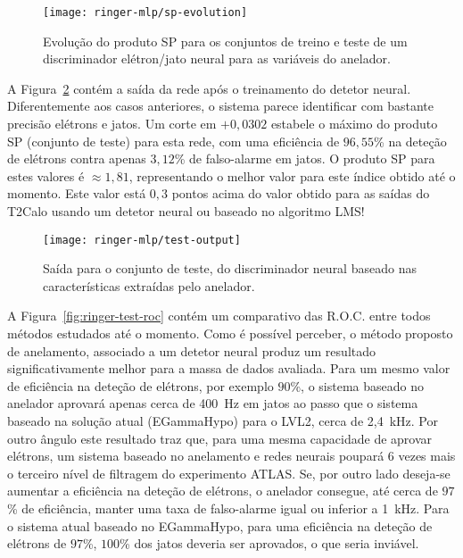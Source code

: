\begin{figure}
\begin{center}
\texttt{[image: ringer-mlp/sp-evolution]}
\end{center}
\caption{Evolução do produto SP para os conjuntos de treino e teste de um
discriminador elétron/jato neural para as variáveis do anelador.}
\label{fig:ringer-mlp-sp}
\end{figure}

A Figura~\ref{fig:ringer-mlp-output} contém a saída da rede após o treinamento
do detetor neural. Diferentemente aos casos anteriores, o sistema parece
identificar com bastante precisão elétrons e jatos. Um corte em $+0,0302$
estabele o máximo do produto SP (conjunto de teste) para esta rede, com uma
eficiência de $96,55$\% na deteção de elétrons contra apenas $3,12$\% de
falso-alarme em jatos. O produto SP para estes valores é $\approx 1,81$,
representando o melhor valor para este índice obtido até o momento. Este valor
está $0,3$ pontos acima do valor obtido para as saídas do T2Calo usando um
detetor neural ou baseado no algoritmo LMS!

\begin{figure}
\begin{center}
\texttt{[image: ringer-mlp/test-output]}
\end{center}
\caption{Saída para o conjunto de teste, do discriminador neural baseado nas
características extraídas pelo anelador.}
\label{fig:ringer-mlp-output}
\end{figure}

A Figura~\ref{fig:ringer-test-roc} contém um comparativo das R.O.C. entre
todos métodos estudados até o momento. Como é possível perceber, o método
proposto de anelamento, associado a um detetor neural produz um resultado
significativamente melhor para a massa de dados avaliada. Para um mesmo valor
de eficiência na deteção de elétrons, por exemplo $90$\%, o sistema baseado no
anelador aprovará apenas cerca de 400~Hz em jatos ao passo que o sistema
baseado na solução atual (EGammaHypo) para o LVL2, cerca de 2,4~kHz. Por outro
ângulo este resultado traz que, para uma mesma capacidade de aprovar elétrons,
um sistema baseado no anelamento e redes neurais poupará 6 vezes mais o
terceiro nível de filtragem do experimento ATLAS. Se, por outro lado deseja-se
aumentar a eficiência na deteção de elétrons, o anelador consegue, até cerca
de $97$\% de eficiência, manter uma taxa de falso-alarme igual ou inferior a
1~kHz. Para o sistema atual baseado no EGammaHypo, para uma eficiência na
deteção de elétrons de $97$\%, $100$\% dos jatos deveria ser aprovados, o que
seria inviável.


